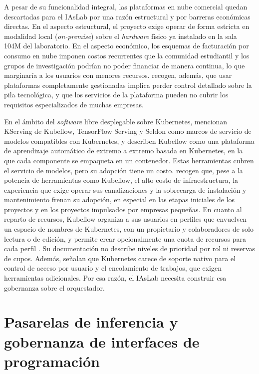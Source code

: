 A pesar de su funcionalidad integral, las plataformas en nube comercial quedan descartadas para el IAsLab por una razón estructural y por barreras económicas directas. En el aspecto estructural, el proyecto exige operar de forma estricta en modalidad local (\emph{on-premise}) sobre el \emph{hardware} físico ya instalado en la sala 104M del laboratorio. En el aspecto económico, los esquemas de facturación por consumo en nube imponen costos recurrentes que la comunidad estudiantil y los grupos de investigación podrían no poder financiar de manera continua, lo que marginaría a los usuarios con menores recursos. \citet{eken-mlopsmultivocalreview-2026} recogen, además, que usar plataformas completamente gestionadas implica perder control detallado sobre la pila tecnológica, y que los servicios de la plataforma pueden no cubrir los requisitos especializados de muchas empresas.

En el ámbito del \emph{software} libre desplegable sobre Kubernetes, \citet{kreuzberger-mlopsoverview-2023} mencionan KServing de Kubeflow, TensorFlow Serving y Seldon como marcos de servicio de modelos compatibles con Kubernetes, y describen Kubeflow como una plataforma de aprendizaje automático de extremo a extremo basada en Kubernetes, en la que cada componente se empaqueta en un contenedor. Estas herramientas cubren el servicio de modelos, pero su adopción tiene un costo. \citet{eken-mlopsmultivocalreview-2026} recogen que, pese a la potencia de herramientas como Kubeflow, el alto costo de infraestructura, la experiencia que exige operar sus canalizaciones y la sobrecarga de instalación y mantenimiento frenan su adopción, en especial en las etapas iniciales de los proyectos y en los proyectos impulsados por empresas pequeñas. En cuanto al reparto de recursos, Kubeflow organiza a sus usuarios en perfiles que envuelven un espacio de nombres de Kubernetes, con un propietario y colaboradores de solo lectura o de edición, y permite crear opcionalmente una cuota de recursos para cada perfil \citep{kubeflow-profiles-2026}. Su documentación no describe niveles de prioridad por rol ni reservas de cupos. Además, \citet{xu-sing-2025} señalan que Kubernetes carece de soporte nativo para el control de acceso por usuario y el encolamiento de trabajos, que exigen herramientas adicionales. Por esa razón, el IAsLab necesita construir esa gobernanza sobre el orquestador.

\section{Pasarelas de inferencia y gobernanza de interfaces de programación}\label{sec:pasarelas-inferencia}

